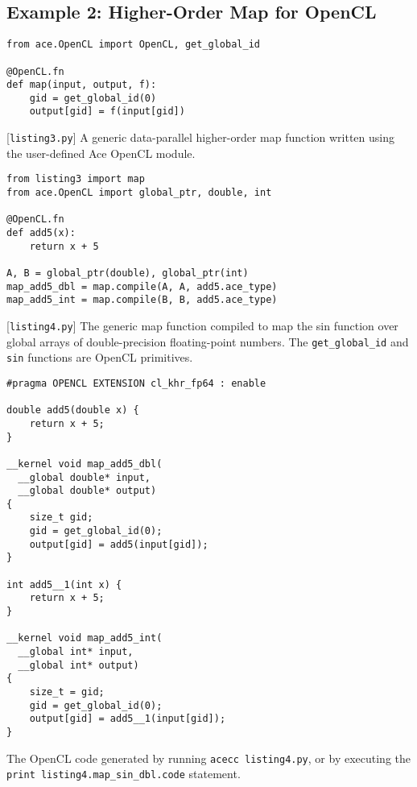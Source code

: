 \documentclass[10pt, conference, compsocconf]{IEEEtran}
\begin{document}
\subsection{Example 2: Higher-Order Map for OpenCL}
\begin{codelisting}
\begin{lstlisting}
from ace.OpenCL import OpenCL, get_global_id

@OpenCL.fn
def map(input, output, f):
    gid = get_global_id(0)
    output[gid] = f(input[gid])
\end{lstlisting}
\caption{[\texttt{listing3.py}] A generic data-parallel higher-order map function written using the user-defined Ace OpenCL module.}
\label{map}
\end{codelisting}

\begin{codelisting}
\begin{lstlisting}
from listing3 import map
from ace.OpenCL import global_ptr, double, int

@OpenCL.fn
def add5(x):
    return x + 5

A, B = global_ptr(double), global_ptr(int)
map_add5_dbl = map.compile(A, A, add5.ace_type)
map_add5_int = map.compile(B, B, add5.ace_type)
\end{lstlisting}
\caption{[\texttt{listing4.py}] The generic map function compiled to map the sin function over global arrays of double-precision floating-point numbers. The \texttt{get\_global\_id} and \texttt{sin} functions are OpenCL primitives.}
\label{mapadd5dbl}
\end{codelisting}

\begin{codelisting}
\begin{lstlisting}[style=OpenCL]
#pragma OPENCL EXTENSION cl_khr_fp64 : enable

double add5(double x) {
    return x + 5;
}

__kernel void map_add5_dbl(
  __global double* input, 
  __global double* output) 
{
    size_t gid;
    gid = get_global_id(0);
    output[gid] = add5(input[gid]);
}

int add5__1(int x) {
    return x + 5;
}

__kernel void map_add5_int(
  __global int* input,
  __global int* output)
{
    size_t = gid;
    gid = get_global_id(0);
    output[gid] = add5__1(input[gid]);
}
\end{lstlisting}
\caption{The OpenCL code generated by running \texttt{acecc listing4.py}, or by executing the  \texttt{print listing4.map\_sin\_dbl.code} statement.}
\label{mapout}
\end{codelisting}
\end{document}
